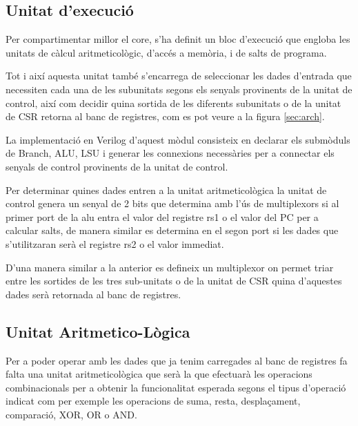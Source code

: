 \documentclass[10pt,a4paper,twocolumn,twoside]{article}
\begin{document}
    
    
    \subsection{Unitat d'execució}
    Per compartimentar millor el core, s'ha definit un bloc d'execució que engloba les unitats de càlcul aritmeticològic, d'accés a memòria, i de salts de programa.
    
    Tot i així aquesta unitat també s'encarrega de seleccionar les dades d'entrada que necessiten cada una de les subunitats segons els senyals provinents de la unitat de control, així com decidir quina sortida de les diferents subunitats o de la unitat de CSR retorna al banc de registres, com es pot veure a la figura \ref{sec:arch}.
    
    La implementació en Verilog d'aquest mòdul consisteix en declarar els submòduls de Branch, ALU, LSU i generar les connexions necessàries per a connectar els senyals de control provinents de la unitat de control. 
    
    Per determinar quines dades entren a la unitat aritmeticològica la unitat de control genera un senyal de 2 bits que determina amb l'ús de multiplexors si al primer port de la alu entra el valor del registre rs1 o el valor del PC per a calcular salts, de manera similar es determina en el segon port si les dades que s'utilitzaran serà el registre rs2 o el valor immediat.
    
    D'una manera similar a la anterior es defineix un multiplexor on permet triar entre les sortides de les tres sub-unitats o de la unitat de CSR quina d'aquestes dades serà retornada al banc de registres.
    
    
    
    
    

    
    
    \subsection{Unitat Aritmetico-Lògica}
    Per a poder operar amb les dades que ja tenim carregades al banc de registres fa falta una unitat aritmeticològica que serà la que efectuarà les operacions combinacionals per a obtenir la funcionalitat esperada segons el tipus d'operació indicat com per exemple  les operacions de suma, resta, desplaçament, comparació, XOR, OR o AND.
    
\end{document}
